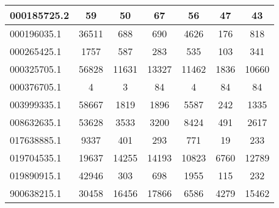 \begin{tabular}{|l||c|c|c|c|c|c|}
\hline
000185725.2 & \cellcolor[RGB]{251, 223, 223} 59 & \cellcolor[RGB]{241, 241, 253} 50 & \cellcolor[RGB]{246, 177, 177} 67 & \cellcolor[RGB]{253, 237, 237} 56 & \cellcolor[RGB]{227, 227, 252} 47 & \cellcolor[RGB]{209, 209, 250} 43 \\
\hline
000196035.1 & \cellcolor[RGB]{235, 71, 71} 36511 & \cellcolor[RGB]{232, 232, 252} 688 & \cellcolor[RGB]{232, 232, 252} 690 & \cellcolor[RGB]{235, 71, 71} 4626 & \cellcolor[RGB]{48, 48, 232} 176 & \cellcolor[RGB]{252, 232, 232} 818 \\
\hline
000265425.1 & \cellcolor[RGB]{235, 71, 71} 1757 & \cellcolor[RGB]{252, 227, 227} 587 & \cellcolor[RGB]{227, 227, 252} 283 & \cellcolor[RGB]{253, 237, 237} 535 & \cellcolor[RGB]{195, 195, 248} 103 & \cellcolor[RGB]{237, 237, 253} 341 \\
\hline
000325705.1 & \cellcolor[RGB]{235, 71, 71} 56828 & \cellcolor[RGB]{254, 250, 250} 11631 & \cellcolor[RGB]{235, 71, 71} 13327 & \cellcolor[RGB]{250, 250, 254} 11462 & \cellcolor[RGB]{48, 48, 232} 1836 & \cellcolor[RGB]{218, 218, 251} 10660 \\
\hline
000376705.1 & \cellcolor[RGB]{232, 232, 252} 4 & \cellcolor[RGB]{232, 232, 252} 3 & \cellcolor[RGB]{252, 232, 232} 84 & \cellcolor[RGB]{232, 232, 252} 4 & \cellcolor[RGB]{252, 232, 232} 84 & \cellcolor[RGB]{252, 232, 232} 84 \\
\hline
003999335.1 & \cellcolor[RGB]{235, 71, 71} 58667 & \cellcolor[RGB]{250, 250, 254} 1819 & \cellcolor[RGB]{254, 250, 250} 1896 & \cellcolor[RGB]{235, 71, 71} 5587 & \cellcolor[RGB]{94, 94, 237} 242 & \cellcolor[RGB]{218, 218, 251} 1335 \\
\hline
008632635.1 & \cellcolor[RGB]{235, 71, 71} 53628 & \cellcolor[RGB]{254, 246, 246} 3533 & \cellcolor[RGB]{246, 246, 254} 3200 & \cellcolor[RGB]{235, 71, 71} 8424 & \cellcolor[RGB]{94, 94, 237} 491 & \cellcolor[RGB]{223, 223, 251} 2617 \\
\hline
017638885.1 & \cellcolor[RGB]{235, 71, 71} 9337 & \cellcolor[RGB]{253, 237, 237} 401 & \cellcolor[RGB]{241, 241, 253} 293 & \cellcolor[RGB]{235, 71, 71} 771 & \cellcolor[RGB]{172, 172, 246} 19 & \cellcolor[RGB]{227, 227, 252} 233 \\
\hline
019704535.1 & \cellcolor[RGB]{235, 71, 71} 19637 & \cellcolor[RGB]{253, 241, 241} 14255 & \cellcolor[RGB]{254, 246, 246} 14193 & \cellcolor[RGB]{223, 223, 251} 10823 & \cellcolor[RGB]{177, 177, 246} 6760 & \cellcolor[RGB]{246, 246, 254} 12789 \\
\hline
019890915.1 & \cellcolor[RGB]{235, 71, 71} 42946 & \cellcolor[RGB]{237, 237, 253} 303 & \cellcolor[RGB]{253, 237, 237} 698 & \cellcolor[RGB]{235, 71, 71} 1955 & \cellcolor[RGB]{218, 218, 251} 115 & \cellcolor[RGB]{227, 227, 252} 232 \\
\hline
900638215.1 & \cellcolor[RGB]{245, 168, 168} 30458 & \cellcolor[RGB]{254, 250, 250} 16456 & \cellcolor[RGB]{254, 246, 246} 17866 & \cellcolor[RGB]{218, 218, 251} 6586 & \cellcolor[RGB]{209, 209, 250} 4279 & \cellcolor[RGB]{255, 255, 255} 15462 \\
\hline
\end{tabular}
